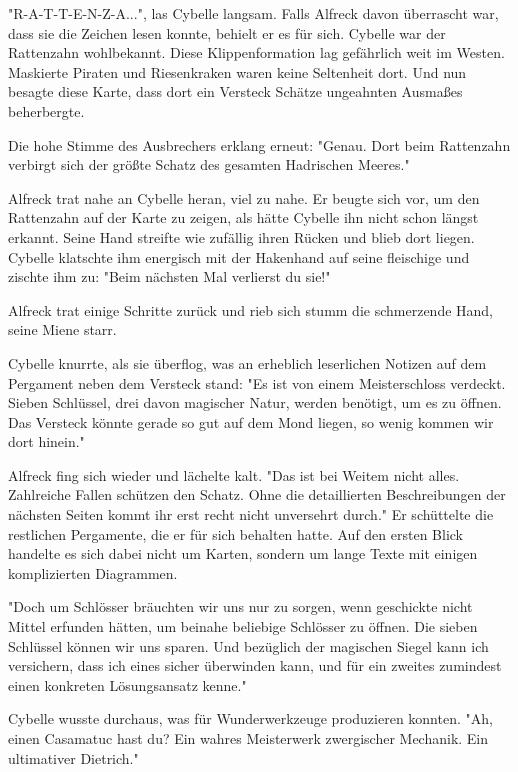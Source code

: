 "R-A-T-T-E-N-Z-A...", las Cybelle langsam. Falls Alfreck davon überrascht war, dass sie die Zeichen lesen konnte, behielt er es für sich. Cybelle war der Rattenzahn wohlbekannt. Diese Klippenformation lag gefährlich weit im Westen. Maskierte Piraten und Riesenkraken waren keine Seltenheit dort. Und nun besagte diese Karte, dass dort ein Versteck Schätze ungeahnten Ausmaßes beherbergte.

Die hohe Stimme des Ausbrechers erklang erneut: "Genau. Dort beim Rattenzahn verbirgt sich der größte Schatz des gesamten Hadrischen Meeres."

Alfreck trat nahe an Cybelle heran, viel zu nahe. Er beugte sich vor, um den Rattenzahn auf der Karte zu zeigen, als hätte Cybelle ihn nicht schon längst erkannt. Seine Hand streifte wie zufällig ihren Rücken und blieb dort liegen. Cybelle klatschte ihm energisch mit der Hakenhand auf seine fleischige und zischte ihm zu: "Beim nächsten Mal verlierst du sie!" 

Alfreck trat einige Schritte zurück und rieb sich stumm die schmerzende Hand, seine Miene starr.

Cybelle knurrte, als sie überflog, was an erheblich leserlichen Notizen auf dem Pergament neben dem Versteck stand: "Es ist von einem Meisterschloss verdeckt. Sieben Schlüssel, drei davon magischer Natur, werden benötigt, um es zu öffnen. Das Versteck könnte gerade so gut auf dem Mond liegen, so wenig kommen wir dort hinein."

Alfreck fing sich wieder und lächelte kalt. "Das ist bei Weitem nicht alles. Zahlreiche Fallen schützen den Schatz. Ohne die detaillierten Beschreibungen der nächsten Seiten kommt ihr erst recht nicht unversehrt durch." Er schüttelte die restlichen Pergamente, die er für sich behalten hatte. Auf den ersten Blick handelte es sich dabei nicht um Karten, sondern um lange Texte mit einigen komplizierten Diagrammen.

"Doch um Schlösser bräuchten wir uns nur zu sorgen, wenn geschickte  nicht Mittel erfunden hätten, um beinahe beliebige Schlösser zu öffnen. Die sieben Schlüssel können wir uns sparen. Und bezüglich der magischen Siegel kann ich versichern, dass ich eines sicher überwinden kann, und für ein zweites zumindest einen konkreten Lösungsansatz kenne."

Cybelle wusste durchaus, was für Wunderwerkzeuge  produzieren konnten. "Ah, einen Casamatuc hast du? Ein wahres Meisterwerk zwergischer Mechanik. Ein ultimativer Dietrich."

